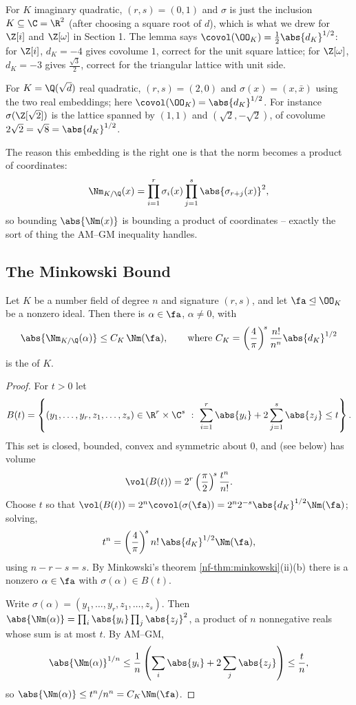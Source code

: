 \begin{example}
	For $K$ imaginary quadratic, $(r,s) = (0,1)$ and $\sigma$ is just the inclusion $K \subseteq \C = \R^2$ (after choosing a square root of $d$), which is what we drew for $\Z[i]$ and $\Z[\omega]$ in Section 1. The lemma says $\covol(\OO_K) = \tfrac12\abs{d_K}^{1/2}$: for $\Z[i]$, $d_K = -4$ gives covolume $1$, correct for the unit square lattice; for $\Z[\omega]$, $d_K=-3$ gives $\tfrac{\sqrt3}{2}$, correct for the triangular lattice with unit side.

	For $K = \Q(\sqrt d)$ real quadratic, $(r,s) = (2,0)$ and $\sigma(x) = (x, \bar x)$ using the two real embeddings; here $\covol(\OO_K) = \abs{d_K}^{1/2}$. For instance $\sigma(\Z[\sqrt2])$ is the lattice spanned by $(1,1)$ and $(\sqrt2,-\sqrt2)$, of covolume $2\sqrt2 = \sqrt 8 = \abs{d_K}^{1/2}$.
\end{example}

The reason this embedding is the right one is that the norm becomes a product of coordinates:
$$\Nm_{K/\Q}(x) = \prod_{i=1}^r\sigma_i(x)\prod_{j=1}^s\abs{\sigma_{r+j}(x)}^2,$$
so bounding $\abs{\Nm(x)}$ is bounding a product of coordinates -- exactly the sort of thing the AM--GM inequality handles.

\subsection{The Minkowski Bound}

\begin{proposition}\label{prop:minkbound}
	Let $K$ be a number field of degree $n$ and signature $(r,s)$, and let $\fa \trianglelefteq \OO_K$ be a nonzero ideal. Then there is $\alpha \in \fa$, $\alpha \neq 0$, with
	$$\abs{\Nm_{K/\Q}(\alpha)} \le C_K\,\Nm(\fa), \qquad \text{where } C_K = \left(\frac4\pi\right)^{\!s}\frac{n!}{n^n}\abs{d_K}^{1/2}$$
	is the  of $K$.
\end{proposition}

\begin{proof}
	For $t > 0$ let
	$$B(t) = \left\{(y_1,\dots,y_r,z_1,\dots,z_s) \in \R^r\times\C^s\ :\ \sum_{i=1}^r\abs{y_i} + 2\sum_{j=1}^s\abs{z_j} \le t\right\}.$$
	This set is closed, bounded, convex and symmetric about $0$, and (see below) has volume
	$$\vol(B(t)) = 2^r\left(\frac\pi2\right)^{\!s}\frac{t^n}{n!}.$$
	Choose $t$ so that $\vol(B(t)) = 2^n\covol(\sigma(\fa)) = 2^n2^{-s}\abs{d_K}^{1/2}\Nm(\fa)$; solving,
	$$t^n = \left(\frac4\pi\right)^{\!s}n!\,\abs{d_K}^{1/2}\Nm(\fa),$$
	using $n - r - s = s$. By Minkowski's theorem \ref{nf-thm:minkowski}(ii)(b) there is a nonzero $\alpha \in \fa$ with $\sigma(\alpha) \in B(t)$.

	Write $\sigma(\alpha) = (y_1,\dots,y_r,z_1,\dots,z_s)$. Then $\abs{\Nm(\alpha)} = \prod_i\abs{y_i}\prod_j\abs{z_j}^2$, a product of $n$ nonnegative reals whose sum is at most $t$. By AM--GM,
	$$\abs{\Nm(\alpha)}^{1/n} \le \frac1n\left(\sum_i\abs{y_i}+2\sum_j\abs{z_j}\right)\le\frac tn,$$
	so $\abs{\Nm(\alpha)} \le t^n/n^n = C_K\Nm(\fa)$.
\end{proof}

